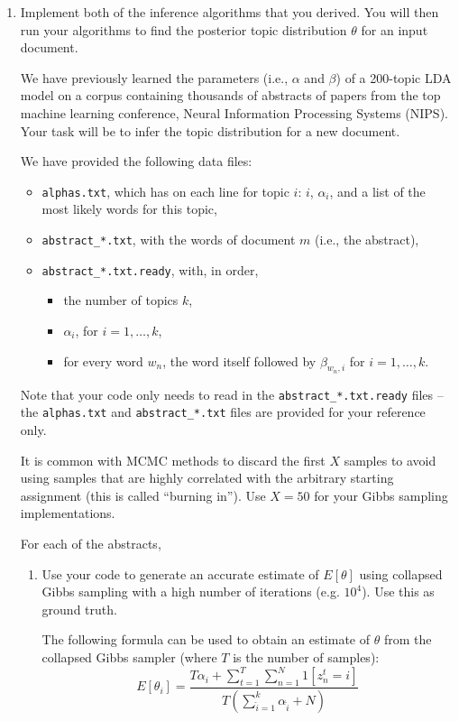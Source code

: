 \documentclass{article}
\begin{document}
\begin{enumerate}
\begin{enumerate}
\item 
Implement both of the inference algorithms that you derived. You will then run your algorithms to find the posterior topic distribution $\theta$ for an input document.

We have previously learned the parameters (i.e., $\alpha$ and $\beta$) of a 200-topic LDA model on a corpus containing thousands of abstracts of papers from the top machine learning conference, Neural Information Processing Systems (NIPS). Your task will be to infer the topic distribution for a new document.

We have provided the following data files:
\begin{itemize}
      \item \texttt{alphas.txt}, which has on each line for topic $i$: $i$, $\alpha_i$, and a list of the most likely words for this topic,
      \item \texttt{abstract\_*.txt}, with the words of document $m$ (i.e., the abstract),
      \item \texttt{abstract\_*.txt.ready}, with, in order,
      \begin{itemize}
           \item the number of topics $k$,
           \item $\alpha_i$, for $i = 1, \ldots, k$,
           \item for every word $w_n$, the word itself followed by $\beta_{w_n,i}$ 
           for $i = 1, \ldots, k$.
      \end{itemize}
\end{itemize}
Note that your code only needs to read in the \texttt{abstract\_*.txt.ready} files -- the \texttt{alphas.txt} and \texttt{abstract\_*.txt} files are provided for your reference only.

It is common with MCMC methods to discard the first $X$ samples to avoid using samples that are highly correlated with the arbitrary starting assignment (this is called ``burning in''). Use $X=50$ for your Gibbs sampling implementations.

For each of the abstracts,
\begin{enumerate}
\item Use your code to generate an accurate estimate of $E[\theta]$ using collapsed Gibbs sampling with a high number of iterations (e.g. $10^4$). Use this as ground truth. %

The following formula can be used to obtain an estimate of $\theta$ from the collapsed Gibbs sampler (where $T$ is the number of samples):
\[
E[\theta_i] = \frac{T\alpha_i + \sum_{t=1}^T\sum_{n=1}^N 1[z^t_{n} = i]}{T(\sum_{\hat{i}=1}^k \alpha_{\hat{i}} + N)}
\]


\end{enumerate}
\end{enumerate}
\end{enumerate}
\end{document}
